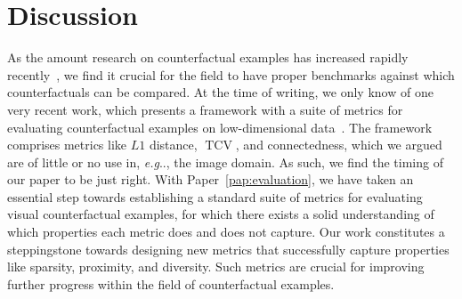 \documentclass[11pt,a4paper,twoside,openright,final]{memoir}
\makeatletter
\DeclareRobustCommand\onedot{\futurelet\@let@token\@onedot}
\def\@onedot{\ifx\@let@token.\else.\null\fi\xspace}
\def\eg{\emph{e.g}\onedot} \def\Eg{\emph{E.g}\onedot}
\newcommand*{\paperref}[1]{Paper~\hyperref[#1]{\ref{#1}}}
\makeatother
\begin{document}
\section{Discussion}\label{sec:eval-discussion}
As the amount research on counterfactual examples has increased rapidly recently~\cite{Stepin2021}, we find it crucial for the field to have proper benchmarks against which counterfactuals can be compared.
At the time of writing, we only know of one very recent work, which presents a framework with a suite of metrics for evaluating counterfactual examples on low-dimensional data~\cite{clara}. 
The framework comprises metrics like $L1$ distance, $\operatorname{TCV}$, and connectedness, which we argued are of little or no use in, \eg, the image domain.
As such, we find the timing of our paper to be just right. 
With \paperref{pap:evaluation}, we have taken an essential step towards establishing a standard suite of metrics for evaluating visual counterfactual examples, for which there exists a solid understanding of which properties each metric does and does not capture.
Our work constitutes a steppingstone towards designing new metrics that successfully capture properties like sparsity, proximity, and diversity.
Such metrics are crucial for improving further progress within the field of counterfactual examples.
\end{document}
